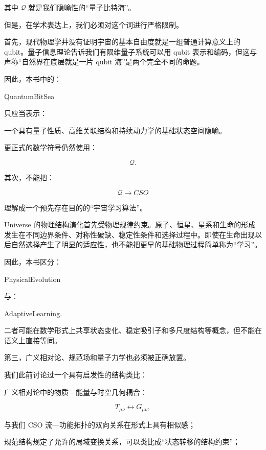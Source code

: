 其中 $\mathcal Q$ 就是我们隐喻性的“量子比特海”。

但是，在学术表达上，我们必须对这个词进行严格限制。

首先，现代物理学并没有证明宇宙的基本自由度就是一组普通计算意义上的 qubit。量子信息理论告诉我们有限维量子系统可以用 qubit 表示和编码，但这与声称“自然界在底层就是一片 qubit 海”是两个完全不同的命题。

因此，本书中的：

\begin{statementbox}
QuantumBitSea
\end{statementbox}

只应当表示：

\begin{statementbox}
一个具有量子性质、高维关联结构和持续动力学的基础状态空间隐喻。
\end{statementbox}

更正式的数学符号仍然使用：

\[
\mathcal Q.
\]

其次，不能把：

\[
\mathcal Q
\rightarrow
CSO
\]

理解成一个预先存在目的的“宇宙学习算法”。

Universe 的物理结构演化首先受物理规律约束。原子、恒星、星系和生命的形成发生在不同边界条件、对称性破缺、稳定性条件和选择过程中。即使在生命出现以后自然选择产生了明显的适应性，也不能把更早的基础物理过程简单称为“学习”。

因此，本书区分：

\begin{statementbox}
PhysicalEvolution
\end{statementbox}

与：

\begin{statementbox}
AdaptiveLearning.
\end{statementbox}

二者可能在数学形式上共享状态变化、稳定吸引子和多尺度结构等概念，但不能在语义上直接等同。

第三，广义相对论、规范场和量子力学也必须被正确放置。

我们此前讨论过一个具有启发性的结构类比：

广义相对论中的物质—能量与时空几何耦合：

\[
T_{\mu\nu}
\leftrightarrow
G_{\mu\nu},
\]

与我们 CSO 流—功能拓扑的双向关系在形式上具有相似感；

规范结构规定了允许的局域变换关系，可以类比成“状态转移的结构约束”；

